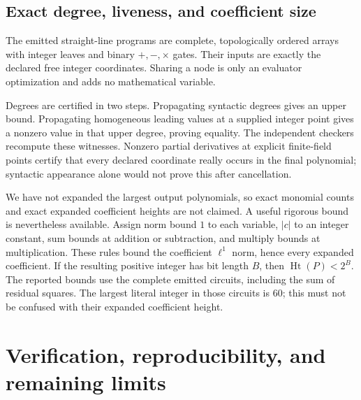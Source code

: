 \documentclass[10pt,letterpaper]{article}
\theoremstyle{remark}\newtheorem{remark}[theorem]{Remark}
\newcommand{\Ht}{\operatorname{Ht}}
\begin{document}
\subsection{Exact degree, liveness, and coefficient size}

The emitted straight-line programs are complete, topologically ordered
arrays with integer leaves and binary $+,-,\times$ gates. Their inputs
are exactly the declared free integer coordinates. Sharing a node is
only an evaluator optimization and adds no mathematical variable.

Degrees are certified in two steps. Propagating syntactic degrees gives
an upper bound. Propagating homogeneous leading values at a supplied
integer point gives a nonzero value in that upper degree, proving
equality. The independent checkers recompute these witnesses. Nonzero
partial derivatives at explicit finite-field points certify that every
declared coordinate really occurs in the final polynomial; syntactic
appearance alone would not prove this after cancellation.

We have not expanded the largest output polynomials, so exact monomial
counts and exact expanded coefficient heights are not claimed. A useful
rigorous bound is nevertheless available. Assign norm bound $1$ to each
variable, $|c|$ to an integer constant, sum bounds at addition or
subtraction, and multiply bounds at multiplication. These rules bound
the coefficient $\ell^1$ norm, hence every expanded coefficient. If the
resulting positive integer has bit length $B$, then $\Ht(P)<2^B$.
The reported bounds use the complete emitted circuits, including the
sum of residual squares. The largest literal integer in those circuits
is 60; this must not be confused with their expanded coefficient height.

\section{Verification, reproducibility, and remaining limits}
\end{document}

